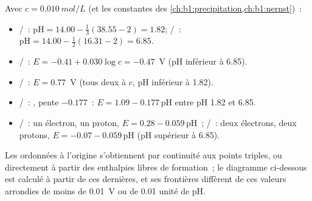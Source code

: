 \begin{example}\label{ex:b1:e-ph-diagrams:iron}
Avec $c = \qty{0.010}{mol/L}$ (et les constantes des \cref{ch:b1:precipitation,ch:b1:nernst})~:
\begin{itemize}
  \item {}/~: $\mathrm{pH} = 14.00 - \frac13(38.55 - 2) = 1.82$;
        /~: $\mathrm{pH} = 14.00 - \frac12(16.31 - 2) = 6.85$.
  \item {}/~: $E = -0.41 + 0.030\log c = -0.47$~V (pH
        inférieur à 6.85).
  \item {}/~: $E = 0.77$~V (tous deux à $c$, pH
        inférieur à 1.82).
  \item {}/~: ,
        pente
        $-0.177$~: $E = 1.09 - 0.177\,\mathrm{pH}$ entre pH 1.82 et 6.85.
  \item {}/~: un électron, un proton, $E = 0.28 -
        0.059\,\mathrm{pH}$~; /~: deux électrons, deux
        protons, $E = -0.07 - 0.059\,\mathrm{pH}$ (pH supérieur à 6.85).
\end{itemize}
Les ordonnées à l'origine s'obtiennent par continuité aux points
triples, ou directement à partir des enthalpies libres de formation~; le
diagramme ci-dessous est calculé à partir de ces dernières, et ses
frontières diffèrent de ces valeurs arrondies de moins de \qty{0.01}{V}
ou de 0.01 unité de pH.
\end{example}

